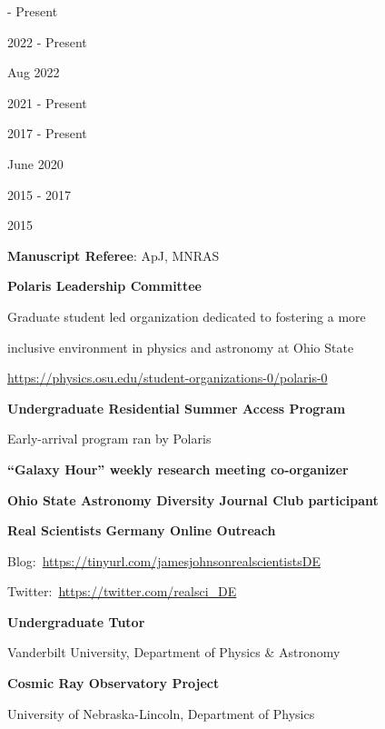 \documentclass[cv.tex]{subfiles}
\begin{document}
\parbox{0.18\textwidth}{%
	 - Present \par
	2022 - Present \par
	\null \par
	\null \par
	\null\par
	Aug 2022 \par
	\null \par
	2021 - Present \par
	2017 - Present \par
	June 2020 \par
	\null \par
	\null \par
	2015 - 2017 \par
	\null \par
	2015 \par
	\null
}
\hspace{1mm}
\parbox{0.8\textwidth}{%
	\vspace{1mm}
	\textbf{Manuscript Referee}: ApJ, MNRAS \par
	\textbf{Polaris Leadership Committee} \par
	Graduate student led organization dedicated to fostering a more \par
	inclusive environment in physics and astronomy at Ohio State \par
	\url{https://physics.osu.edu/student-organizations-0/polaris-0} \par
	\textbf{Undergraduate Residential Summer Access Program} \par
	Early-arrival program ran by Polaris \par
	\textbf{``Galaxy Hour'' weekly research meeting co-organizer} \par
	\textbf{Ohio State Astronomy Diversity Journal Club participant} \par
	\textbf{Real Scientists Germany Online Outreach} \par
	Blog:~\url{https://tinyurl.com/jamesjohnsonrealscientistsDE} \par
	Twitter:~\url{https://twitter.com/realsci_DE} \par
	\textbf{Undergraduate Tutor} \par
	Vanderbilt University, Department of Physics \& Astronomy \par
	\textbf{Cosmic Ray Observatory Project} \par
	University of Nebraska-Lincoln, Department of Physics
}
\end{document}
